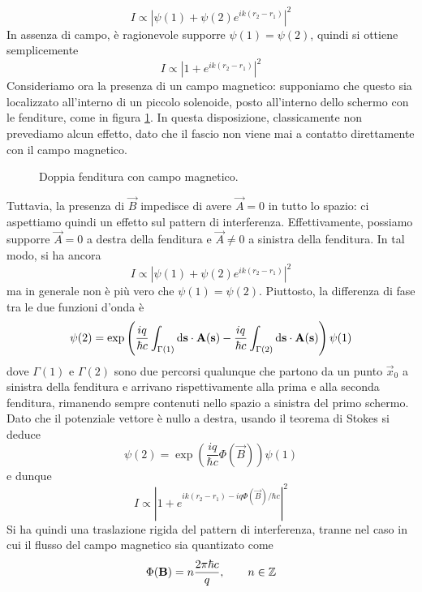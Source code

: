 \documentclass[a4paper, 11pt]{article}
\begin{document}
\[I\propto\left|\psi(1)+\psi(2)e^{ik(r_2-r_1)}\right|^2\]
In assenza di campo, è ragionevole supporre $\psi(1)=\psi(2)$, quindi si ottiene semplicemente
\[I\propto\left|1+e^{ik(r_2-r_1)}\right|^2\]
Consideriamo ora la presenza di un campo magnetico: supponiamo che questo sia localizzato all'interno di un piccolo solenoide, posto all'interno dello schermo con le fenditure, come in figura \ref{fig:fend2}. In questa disposizione, classicamente non prevediamo alcun effetto, dato che il fascio non viene mai a contatto direttamente con il campo magnetico.
\begin{figure}[h!]
	\centering
	\caption{Doppia fenditura con campo magnetico.}
	\label{fig:fend2}
\end{figure}
Tuttavia, la presenza di $\vec{B}$ impedisce di avere $\vec{A}=0$ in tutto lo spazio: ci aspettiamo quindi un effetto sul pattern di interferenza. Effettivamente, possiamo supporre $\vec{A}=0$ a destra della fenditura e $\vec{A}\neq0$ a sinistra della fenditura. In tal modo, si ha ancora
\[I\propto\left|\psi(1)+\psi(2)e^{ik(r_2-r_1)}\right|^2\]
ma in generale non è più vero che $\psi(1)=\psi(2)$. Piuttosto, la differenza di fase tra le due funzioni d'onda è
\[\psi(2)=\exp\left(\frac{iq}{\hbar c}\int_{\Gamma(1)}\mathrm{d} \mathbf{s}\cdot\mathbf{A}(\mathbf{s})-\frac{iq}{\hbar c}\int_{\Gamma(2)}\mathrm{d} \mathbf{s}\cdot\mathbf{A}(\mathbf{s})\right)\psi(1)\]
dove $\Gamma(1)$ e $\Gamma(2)$ sono due percorsi qualunque che partono da un punto $\vec{x}_0$ a sinistra della fenditura e arrivano rispettivamente alla prima e alla seconda fenditura, rimanendo sempre contenuti nello spazio a sinistra del primo schermo. Dato che il potenziale vettore è nullo a destra, usando il teorema di Stokes si deduce
\[\psi(2)=\exp\left(\frac{iq}{\hbar c}\Phi(\vec{B})\right)\psi(1)\]
e dunque
\[I\propto\left|1+e^{ik(r_2-r_1)-iq\Phi(\vec{B})/\hbar c}\right|^2\]
Si ha quindi una traslazione rigida del pattern di interferenza, tranne nel caso in cui il flusso del campo magnetico sia quantizato come
\[\Phi(\mathbf{B})=n\frac{2\pi\hbar c}{q},\qquad n\in\mathbb{Z}\]
\end{document}
